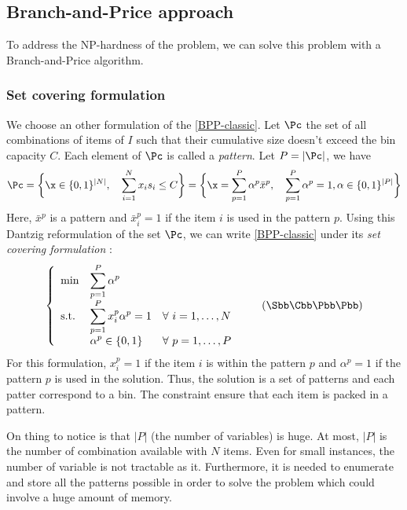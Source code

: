 \subsection{Branch-and-Price approach }

To address the NP-hardness of the problem, we can solve this problem with a Branch-and-Price algorithm.

\subsubsection{Set covering formulation}

We choose an other formulation of the \eqref{BPP-classic}. Let $\Pc$ the set of all combinations of items of $I$ such that their cumulative size doesn't exceed the bin capacity $C$. Each element of $\Pc$ is called a \textit{pattern}. Let $P=|\Pc|$, we have
\begin{equation*}
	\Pc = \bigg \{ \x \in \{0,1\}^{|N|}, \quad \sum_{i=1}^N x_i s_i \leq C \bigg \} = \bigg \{ \x = \sum_{p=1}^P \alpha^p \bar{x}^p, \quad \sum_{p=1}^P \alpha^p = 1, \alpha \in \{0,1\}^{|P|}  \bigg \}
\end{equation*}
Here, $\bar{x}^p$ is a pattern and $\bar{x}^p_i=1$ if the item $i$ is used in the pattern $p$. Using this Dantzig reformulation of the set $\Pc$, we can write \eqref{BPP-classic} under its \textit{set covering formulation} :
\begin{equation}
	\label{SCBPP}
		\left \{
		\begin{array}{*5{>{\displaystyle}l}}
		\min & \sum_{p=1}^P \alpha^p \\
		\st & \sum_{p=1}^P x_i^p\alpha^p = 1 & \forall \ i = 1,\dots,N \\
		& \alpha^{p} \in \{0,1\} &  \forall \ p = 1,\dots,P
		\end{array}
		\right.
	\tag{$\Sbb\Cbb\Bbb\Pbb\Pbb$}
\end{equation}
For this formulation, $x_i^p=1$ if the item $i$ is within the pattern $p$ and $\alpha^p=1$ if the pattern $p$ is used in the solution. Thus, the solution is a set of patterns and each patter correspond to a bin. The constraint ensure that each item is packed in a pattern.

On thing to notice is that $|P|$ (the number of variables) is huge. At most, $|P|$ is the number of combination available with $N$ items. Even for small instances, the number of variable is not tractable as it. Furthermore, it is needed to enumerate and store all the patterns possible in order to solve the problem which could involve a huge amount of memory. 

